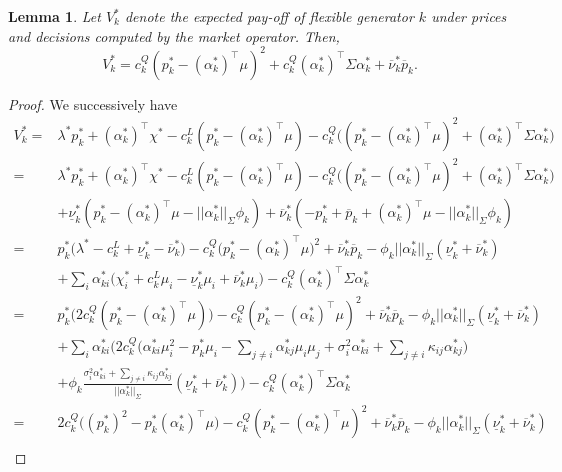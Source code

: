 \documentclass{article}
\newtheorem{lemma}{Lemma}
\begin{document}
\begin{lemma}\label{ExpectedPayOff}
Let $V_k^*$ denote the expected pay-off of flexible generator $k$ under prices and decisions computed by the market operator. Then,
\begin{equation*}
V_k^* = c_k^Q(p_k^* - (\alpha_k^*)^\top \mu)^2 + c_k^Q (\alpha_k^*)^\top \Sigma \alpha_k^* + \overline{\nu}_k^* \overline{p}_k.
\end{equation*}
\end{lemma}
\begin{proof}
We successively have
\begin{align*}
    V_k^* =& \lambda^*p_k^* + (\alpha_k^*)^\top\chi^* - c_k^L(p_k^* - (\alpha_k^*)^\top \mu) - c_k^Q\big((p_k^* - (\alpha_k^*)^\top \mu)^2 + (\alpha_k^*)^\top\Sigma \alpha_k^*\big) \\
    =& \lambda^*p_k^* + (\alpha_k^*)^\top\chi^* - c_k^L(p_k^* - (\alpha_k^*)^\top \mu) - c_k^Q\big((p_k^* - (\alpha_k^*)^\top \mu)^2 + (\alpha_k^*)^\top\Sigma \alpha_k^*\big)\\
   &+ \underline{\nu}_k^*(p_k^* - (\alpha_k^*)^\top \mu - ||\alpha_k^*||_{\Sigma} \phi_k) + \overline{\nu}_k^* (-p_k^* + \overline{p}_k + (\alpha_k^*)^\top \mu - ||\alpha_k^*||_{\Sigma} \phi_k)\\
=& p_k^*\big(\lambda^* - c_k^L + \underline{\nu}_k^* - \overline{\nu}_k^*\big) - c_k^Q\big(p_k^* - (\alpha_k^*)^\top \mu\big)^2 + \overline{\nu}_k^* \overline{p}_k - \phi_k||\alpha_k^*||_{\Sigma} (\underline{\nu}_k^* + \overline{\nu}_k^*)\\
    &+ \sum_i \alpha_{ki}^*\big(\chi_i^* + c_k^L \mu_i - \underline{\nu}_k^* \mu_i + \overline{\nu}_k^* \mu_i\big) - c_k^Q (\alpha_k^*)^\top\Sigma \alpha_k^* \\
    =& p_k^*\big(2c_k^Q(p_k^* - (\alpha_k^*)^\top \mu)\big) - c_k^Q(p_k^* - (\alpha_k^*)^\top \mu)^2 + \overline{\nu}_k^* \overline{p}_k - \phi_k||\alpha_k^*||_{\Sigma} (\underline{\nu}_k^* + \overline{\nu}_k^*)\\ 
    &+ \sum_i \alpha_{ki}^*\Big(2c_k^Q\big(\alpha_{ki}^*\mu_i^2 - p_k^* \mu_i - \sum_{j \ne i} \alpha_{kj}^* \mu_i \mu_j + \sigma_i^2 \alpha_{ki}^* + \sum_{j \ne i} \kappa_{ij} \alpha_{kj}^*\big) \\
    &+ \phi_k \frac{\sigma_i^2 \alpha_{ki}^* + \sum_{j \ne i} \kappa_{ij} \alpha_{kj}^*}{||\alpha_k^*||_\Sigma}(\underline{\nu}_k^* +\overline{\nu}_k^*)\Big) - c_k^Q (\alpha_k^*)^\top\Sigma \alpha_k^*\\
    =& 2c_k^Q\big((p_k^*)^2 - p_k^*(\alpha_k^*)^\top \mu\big) - c_k^Q(p_k^* - (\alpha_k^*)^\top \mu)^2 + \overline{\nu}_k^* \overline{p}_k - \phi_k||\alpha_k^*||_{\Sigma} (\underline{\nu}_k^* + \overline{\nu}_k^*)\\ 

\end{align*}
\end{proof}
\end{document}

